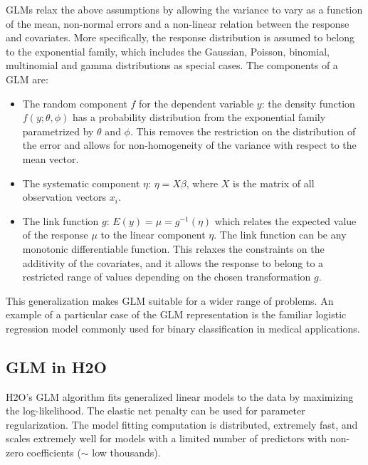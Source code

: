 GLMs relax the above assumptions by allowing the variance to vary as a function of the mean, non-normal errors and a non-linear relation between the response and covariates. More specifically, the response distribution is assumed to belong to the exponential family, which includes the Gaussian, Poisson, binomial, multinomial and gamma distributions as special cases. The components of a GLM are:
\begin{itemize}
\item The random component $f$ for the dependent variable $y$: the density function $f(y;\theta,\phi)$ has a probability distribution from the exponential family parametrized by $\theta$ and $\phi$. This removes the restriction on the distribution of the error and allows for non-homogeneity of the variance with respect to the mean vector.
\item The systematic component $\eta$: $\eta = X\beta$, where $X$ is the matrix of all observation vectors $x_i$.
\item The link function $g$: $E(y) = \mu = g^{-1}(\eta)$ which relates the expected value of the response $\mu$ to the linear component $\eta$. The link function can be any monotonic differentiable function. This relaxes the constraints on the additivity of the covariates, and it allows the response to belong to a restricted range of values depending on the chosen transformation $g$.
\end{itemize}


This generalization makes GLM suitable for a wider range of problems. An example of a particular case of the GLM representation is the familiar logistic regression model commonly used for binary classification in medical applications. 


\subsection{GLM in H2O}
H2O's GLM algorithm fits generalized linear models to the data by maximizing the log-likelihood. The elastic net penalty can be used for parameter regularization. The model fitting computation is distributed, extremely fast, and scales extremely well for models with a limited number of predictors with non-zero coefficients ($\mathtt{\sim}$ low thousands).  

